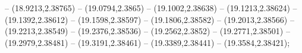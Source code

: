 {-- (18.9213,2.38765) -- (19.0794,2.3865) -- (19.1002,2.38638) -- (19.1213,2.38624) -- (19.1392,2.38612) -- (19.1598,2.38597) -- (19.1806,2.38582) -- (19.2013,2.38566) -- (19.2213,2.38549) -- (19.2376,2.38536) -- (19.2562,2.3852) -- (19.2771,2.38501)   -- (19.2979,2.38481) -- (19.3191,2.38461) -- (19.3389,2.38441) -- (19.3584,2.38421);
}
